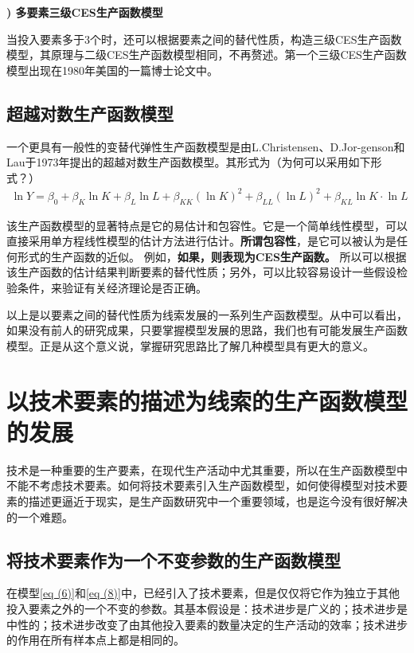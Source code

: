 {\bf {}) 多要素三级CES生产函数模型}
		
	当投入要素多于3个时，还可以根据要素之间的替代性质，构造三级CES生产函数模型，其原理与二级CES生产函数模型相同，不再赘述。第一个三级CES生产函数模型出现在1980年美国的一篇博士论文中。

\subsection{超越对数生产函数模型} 
		
	一个更具有一般性的变替代弹性生产函数模型是由L.Christensen、D.Jor-genson和Lau于1973年提出的超越对数生产函数模型。其形式为（为何可以采用如下形式？）
	\begin{align}
		\ln Y=\beta_{0}+\beta_{K} \ln K+\beta_{L} \ln L+\beta_{K K}(\ln K)^{2}+\beta_{L L}(\ln L)^{2}+\beta_{K L} \ln K \cdot \ln L
		\label{eq (21)}
	\end{align} 

	该生产函数模型的显著特点是它的易估计和包容性。它是一个简单线性模型，可以直接采用单方程线性模型的估计方法进行估计。\textbf{所谓包容性}，是它可以被认为是任何形式的生产函数的近似。
	例如，\textbf{如果，则表现为CES生产函数。}
	所以可以根据该生产函数的估计结果判断要素的替代性质；另外，可以比较容易设计一些假设检验条件，来验证有关经济理论是否正确。
		
	以上是以要素之间的替代性质为线索发展的一系列生产函数模型。从中可以看出，如果没有前人的研究成果，只要掌握模型发展的思路，我们也有可能发展生产函数模型。正是从这个意义说，掌握研究思路比了解几种模型具有更大的意义。

\section{以技术要素的描述为线索的生产函数模型的发展} 

技术是一种重要的生产要素，在现代生产活动中尤其重要，所以在生产函数模型中不能不考虑技术要素。如何将技术要素引入生产函数模型，如何使得模型对技术要素的描述更逼近于现实，是生产函数研究中一个重要领域，也是迄今没有很好解决的一个难题。
	
{\subsection{将技术要素作为一个不变参数的生产函数模型}}
	
	在模型\eqref{eq (6)}和\eqref{eq (8)}中，已经引入了技术要素，但是仅仅将它作为独立于其他投入要素之外的一个不变的参数。其基本假设是：技术进步是广义的；技术进步是中性的；技术进步改变了由其他投入要素的数量决定的生产活动的效率；技术进步的作用在所有样本点上都是相同的。
		
